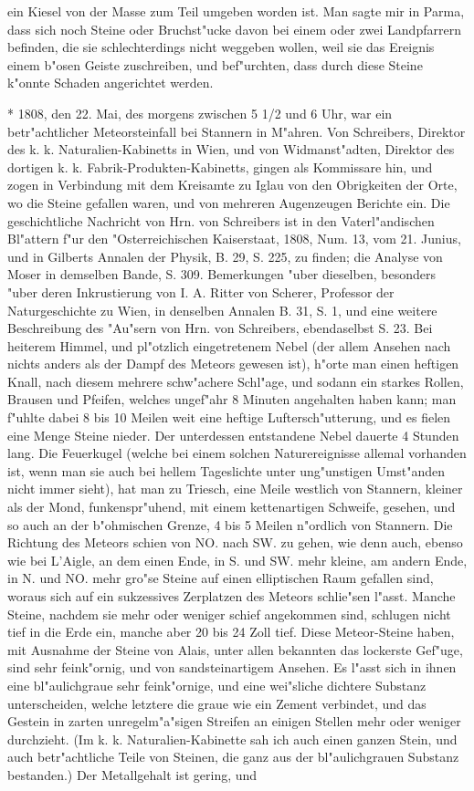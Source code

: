 \documentclass[a4paper, 11pt, oneside, polutonikogreek, german]{article}
\begin{document}
ein Kiesel von der Masse zum Teil umgeben worden ist. Man sagte mir in Parma, dass sich noch Steine oder Bruchst"ucke davon bei einem oder zwei Landpfarrern befinden, die sie schlechterdings nicht weggeben wollen, weil sie das Ereignis einem b"osen Geiste zuschreiben, und bef"urchten, dass durch diese Steine k"onnte Schaden angerichtet werden.

* 1808, den 22. Mai, des morgens zwischen 5 1/2 und 6 Uhr, war ein betr"achtlicher Meteorsteinfall bei Stannern in M"ahren. Von Schreibers, Direktor des k. k. Naturalien-Kabinetts in Wien, und von Widmanst"adten, Direktor des dortigen k. k. Fabrik-Produkten-Kabinetts, gingen als Kommissare hin, und zogen in Verbindung mit dem Kreisamte zu Iglau von den Obrigkeiten der Orte, wo die Steine gefallen waren, und von mehreren Augenzeugen Berichte ein. Die geschichtliche Nachricht von Hrn. von Schreibers ist in den Vaterl"andischen Bl"attern f"ur den "Osterreichischen Kaiserstaat, 1808, Num. 13, vom 21. Junius, und in Gilberts Annalen der Physik, B. 29, S. 225, zu finden; die Analyse von Moser in demselben Bande, S. 309. Bemerkungen "uber dieselben, besonders "uber deren Inkrustierung von I. A. Ritter von Scherer, Professor der Naturgeschichte zu Wien, in denselben Annalen B. 31, S. 1, und eine weitere Beschreibung des "Au"sern von Hrn. von Schreibers, ebendaselbst S. 23. Bei heiterem Himmel, und pl"otzlich eingetretenem Nebel (der allem Ansehen nach nichts anders als der Dampf des Meteors gewesen ist), h"orte man einen heftigen Knall, nach diesem mehrere schw"achere Schl"age, und sodann ein starkes Rollen, Brausen und Pfeifen, welches ungef"ahr 8 Minuten angehalten haben kann; man f"uhlte dabei 8 bis 10 Meilen weit eine heftige Luftersch"utterung, und es fielen eine Menge Steine nieder. Der unterdessen entstandene Nebel dauerte 4 Stunden lang. Die Feuerkugel (welche bei einem solchen Naturereignisse allemal vorhanden ist, wenn man sie auch bei hellem Tageslichte unter ung"unstigen Umst"anden nicht immer sieht), hat man zu Triesch, eine Meile westlich von Stannern, kleiner als der Mond, funkenspr"uhend, mit einem kettenartigen Schweife, gesehen, und so auch an der b"ohmischen Grenze, 4 bis 5 Meilen n"ordlich von Stannern. Die Richtung des Meteors schien von NO. nach SW. zu gehen, wie denn auch, ebenso wie bei L'Aigle, an dem einen Ende, in S. und SW. mehr kleine, am andern Ende, in N. und NO. mehr gro"se Steine auf einen elliptischen Raum gefallen sind, woraus sich auf ein sukzessives Zerplatzen des Meteors schlie"sen l"asst. Manche Steine, nachdem sie mehr oder weniger schief angekommen sind, schlugen nicht tief in die Erde ein, manche aber 20 bis 24 Zoll tief. Diese Meteor-Steine haben, mit Ausnahme der Steine von Alais, unter allen bekannten das lockerste Gef"uge, sind sehr feink"ornig, und von sandsteinartigem Ansehen. Es l"asst sich in ihnen eine bl"aulichgraue sehr feink"ornige, und eine wei"sliche dichtere Substanz unterscheiden, welche letztere die graue wie ein Zement verbindet, und das Gestein in zarten unregelm"a"sigen Streifen an einigen Stellen mehr oder weniger durchzieht. (Im k. k. Naturalien-Kabinette sah ich auch einen ganzen Stein, und auch betr"achtliche Teile von Steinen, die ganz aus der bl"aulichgrauen Substanz bestanden.) Der Metallgehalt ist gering, und 
\end{document}
